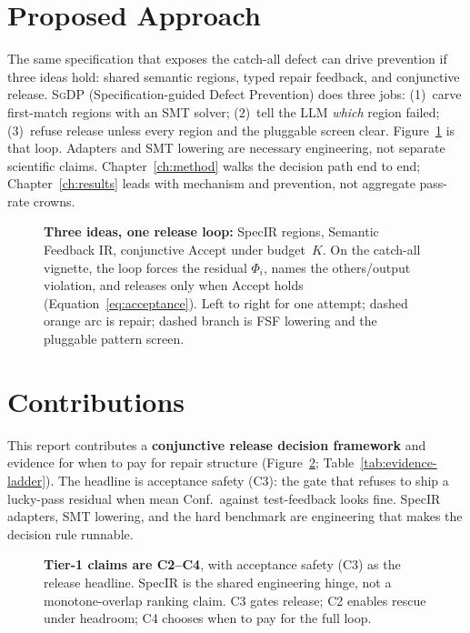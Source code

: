 \section{Proposed Approach}
\label{sec:intro:approach}

The same specification that exposes the catch-all defect can drive prevention
if three ideas hold: shared semantic regions, typed repair feedback, and
conjunctive release.
\textsc{SgDP} (Specification-guided Defect Prevention) does three jobs:
(1)~carve first-match regions with an SMT solver; (2)~tell the LLM
\emph{which} region failed; (3)~refuse release unless every region and the
pluggable screen clear.
Figure~\ref{fig:sgdp-overview} is that loop.
Adapters and SMT lowering are necessary engineering, not separate scientific
claims.
Chapter~\ref{ch:method} walks the decision path end to end;
Chapter~\ref{ch:results} leads with mechanism and prevention, not aggregate
pass-rate crowns.

\begin{figure}[t]
  \centering
  \caption{\textbf{Three ideas, one release loop:} SpecIR regions, Semantic
    Feedback IR, conjunctive $\mathrm{Accept}$ under budget~$K$.
    On the catch-all vignette, the loop forces the residual $\Phi_i$, names
    the others/output violation, and releases only when Accept holds
    (Equation~\eqref{eq:acceptance}).
    Left to right for one attempt; dashed orange arc is repair; dashed branch
    is FSF lowering and the pluggable pattern screen.}
  \label{fig:sgdp-overview}
\end{figure}


\section{Contributions}
\label{sec:intro:contributions}

This report contributes a \textbf{conjunctive release decision framework} and
evidence for when to pay for repair structure
(Figure~\ref{fig:contribution-map}; Table~\ref{tab:evidence-ladder}).
The headline is acceptance safety (C3): the gate that refuses to ship a
lucky-pass residual when mean Conf.\ against test-feedback looks fine.
SpecIR adapters, SMT lowering, and the hard benchmark are engineering that
makes the decision rule runnable.



\begin{figure}[t]
  \centering
  \caption{\textbf{Tier-1 claims are C2--C4}, with acceptance safety (C3) as
    the release headline.
    SpecIR is the shared engineering hinge, not a monotone-overlap ranking
    claim.
    C3 gates release; C2 enables rescue under headroom; C4 chooses when to
    pay for the full loop.}
  \label{fig:contribution-map}
\end{figure}

